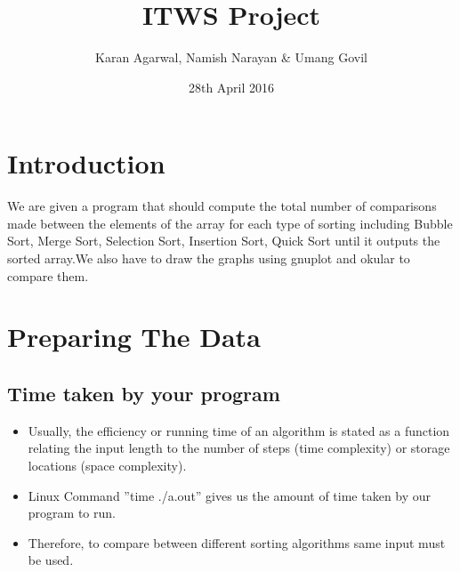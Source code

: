 \documentclass[22pt]{IEEEtran}
\title{ITWS Project}
\author{Karan Agarwal,
Namish Narayan \& Umang Govil}
\date{28th April 2016}
\begin{document}
\maketitle

\section{Introduction}
\label{sec:Intro}
We are given a program that should compute the total number of comparisons made
between the elements of the array for each type of sorting including Bubble Sort, Merge Sort, Selection Sort, Insertion Sort, Quick Sort until it outputs the sorted array.We also have to draw the graphs using gnuplot and okular to compare them.

\section{Preparing The Data}
\label{sec:Prep}

\subsection{Time taken by your program}
\begin{itemize}
    \item Usually, the efficiency or running time of an algorithm is stated as a function relating the input length to the number of steps (time complexity) or storage locations (space complexity).\\
    \item Linux Command ”time ./a.out” gives us the amount of time taken by our program to run.\\
    \item Therefore, to compare between different sorting algorithms same input must be used.\\
\end{itemize}
\end{document}
